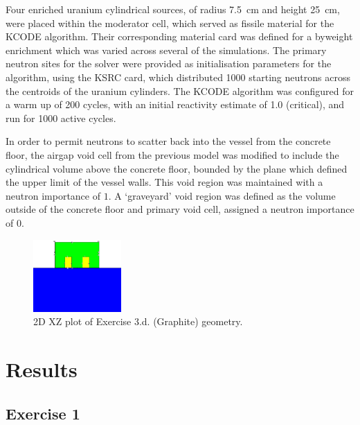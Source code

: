 \documentclass{article}
\begin{document}
    Four enriched uranium cylindrical sources, of radius \SI{7.5}{\cm} and height \SI{25}{\cm}, were placed within the moderator cell, which served as fissile material for the KCODE algorithm. Their corresponding material card was defined for a by\textendash weight enrichment which was varied across several of the simulations. The primary neutron sites for the solver were provided as initialisation parameters for the algorithm, using the KSRC card, which distributed 1000 starting neutrons across the centroids of the uranium cylinders. The KCODE algorithm was configured for a warm up of 200 cycles, with an initial reactivity estimate of 1.0 (critical), and run for 1000 active cycles.

    In order to permit neutrons to scatter back into the vessel from the concrete floor, the air\textendash gap void cell from the previous model was modified to include the cylindrical volume above the concrete floor, bounded by the plane which defined the upper limit of the vessel walls. This void region was maintained with a neutron importance of $1$. A `graveyard' void region was defined as the volume outside of the concrete floor and primary void cell, assigned a neutron importance of $0$.

    \begin{figure}[htb]
      \centering
      \includegraphics[width=0.3\textwidth]{criticality.png}
      \caption{2D XZ plot of Exercise 3.d. (Graphite) geometry.}
      \label{fig:ex_3_d_2_geometry}
    \end{figure}

\section{Results}
  \subsection{Exercise 1}
\end{document}
